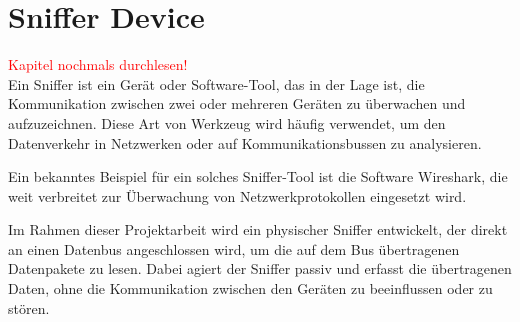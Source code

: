 



\section{Sniffer Device}
\textcolor{red}{Kapitel nochmals durchlesen!}\\



Ein Sniffer ist ein Gerät oder Software-Tool, das in der Lage ist, die Kommunikation zwischen zwei
oder mehreren Geräten zu überwachen und aufzuzeichnen. Diese Art von Werkzeug wird häufig verwendet,
um den Datenverkehr in Netzwerken oder auf Kommunikationsbussen zu analysieren.

Ein bekanntes Beispiel für ein solches Sniffer-Tool ist die Software Wireshark, die weit verbreitet
zur Überwachung von Netzwerkprotokollen eingesetzt wird.

Im Rahmen dieser Projektarbeit wird ein physischer Sniffer entwickelt, der direkt an einen Datenbus
angeschlossen wird, um die auf dem Bus übertragenen Datenpakete zu lesen. Dabei agiert der Sniffer
passiv und erfasst die übertragenen Daten, ohne die Kommunikation zwischen den Geräten zu beeinflussen
oder zu stören.



